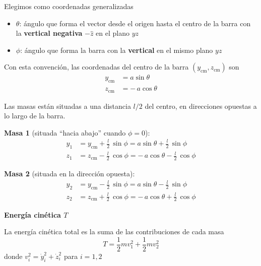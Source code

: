 \documentclass{article}
\begin{document}
Elegimos como coordenadas generalizadas
\begin{itemize}
  \item[$\bullet$] $\theta$: ángulo que forma el vector desde el origen hasta el centro
  de la barra con la \textbf{vertical negativa} $-\hat z$ en el plano $yz$
  \item[$\bullet$] $\phi$: ángulo que forma la barra con la \textbf{vertical} en el
  mismo plano $yz$
\end{itemize}

Con esta convención, las coordenadas del centro de la barra $(y_{\text{cm}},
z_{\text{cm}})$ son
\begin{equation}
\begin{split}
y_{\text{cm}} &= a\sin\theta \\[4pt]
z_{\text{cm}} &= -\,a\cos\theta
\end{split}
\label{eq:cm-48}
\end{equation}

Las masas están situadas a una distancia $l/2$ del centro, en direcciones
opuestas a lo largo de la barra.

\medskip
\textbf{Masa 1} (situada “hacia abajo” cuando $\phi=0$):
\begin{equation}
\begin{split}
y_{1} &= y_{\text{cm}} + \frac{l}{2}\,\sin\phi
      = a\sin\theta + \frac{l}{2}\,\sin\phi \\[4pt]
z_{1} &= z_{\text{cm}} - \frac{l}{2}\,\cos\phi
      = -\,a\cos\theta - \frac{l}{2}\,\cos\phi
\end{split}
\label{eq:pos-masa1}
\end{equation}

\textbf{Masa 2} (situada en la dirección opuesta):
\begin{equation}
\begin{split}
y_{2} &= y_{\text{cm}} - \frac{l}{2}\,\sin\phi
      = a\sin\theta - \frac{l}{2}\,\sin\phi \\[4pt]
z_{2} &= z_{\text{cm}} + \frac{l}{2}\,\cos\phi
      = -\,a\cos\theta + \frac{l}{2}\,\cos\phi
\end{split}
\label{eq:pos-masa2}
\end{equation}

\textcolor{trueblue}{\textbf{Energía cinética $T$}}

La energía cinética total es la suma de las contribuciones de cada masa
\begin{equation}
T = \frac{1}{2}m v_{1}^{2} + \frac{1}{2}m v_{2}^{2}
\label{eq:T-def-48}
\end{equation}
donde $v_{i}^{2} = \dot y_{i}^{2} + \dot z_{i}^{2}$ para $i=1,2$
\end{document}
